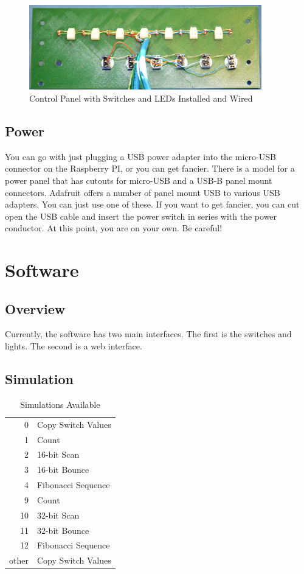 \documentclass[10pt, openany]{book}
\begin{document}
\begin{figure}[ht!]
  \centering
  \includegraphics[width=0.9\textwidth]{../Pict/Switch3.jpg}
  \caption{Control Panel with Switches and LEDs Installed and Wired}
  \label{fig:Switch3}
\end{figure}

\section{Power}
You can go with just plugging a USB power adapter into the micro-USB connector on the Raspberry PI, or you can get fancier.  There is a model for a power panel that has cutouts for micro-USB and a USB-B panel mount connectors.  Adafruit offers a number of panel mount USB to various USB adapters.  You can just use one of these.  If you want to get fancier, you can cut open the USB cable and insert the power switch in series with the power conductor.  At this point, you are on your own.  Be careful!

\chapter{Software}
\section{Overview}
Currently, the software has two main interfaces.  The first is the switches and lights.  The second is a web interface.

\section{Simulation}

\begin{table}
  \label{tbl:Simulations}
  \caption{Simulations Available}
  \centering
  \begin{tabular}{|r|l|}
    \hline
    0 & Copy Switch Values\\
    1 & Count\\
    2 & 16-bit Scan\\
    3 & 16-bit Bounce\\
    4 & Fibonacci Sequence\\
    9 & Count\\
    10 & 32-bit Scan\\
    11 & 32-bit Bounce\\
    12 & Fibonacci Sequence\\
    \hline
    other & Copy Switch Values\\
    \hline
  \end{tabular}
\end{table}
\end{document}
